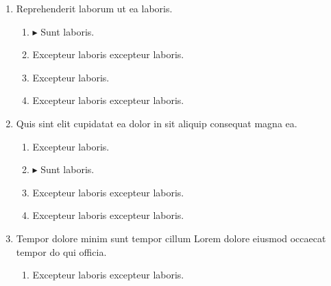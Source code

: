\documentclass[a4paper,12pt]{article}
\begin{document}
\begin{enumerate}[label=\textbf{\arabic*.}]
\begin{multicols}{2}
\begin{enumerate}
		\item  Excepteur laboris.
    
		\item  Excepteur laboris excepteur laboris.
    
		\item $\blacktriangleright$  Sunt laboris.
    
	\end{enumerate}

\end{multicols}
\item Reprehenderit laborum ut ea laboris.
\begin{multicols}{2}
	\begin{enumerate}
		\item $\blacktriangleright$  Sunt laboris.
    
		\item  Excepteur laboris excepteur laboris.
  
		\item  Excepteur laboris.
    
		\item  Excepteur laboris excepteur laboris.
    
	\end{enumerate}

\end{multicols}
\item Quis sint elit cupidatat ea dolor in sit aliquip consequat magna ea.
\begin{multicols}{2}
	\begin{enumerate}
		\item  Excepteur laboris.
    
		\item $\blacktriangleright$  Sunt laboris.
    
		\item  Excepteur laboris excepteur laboris.
    
		\item  Excepteur laboris excepteur laboris.
  
	\end{enumerate}

\end{multicols}
\item Tempor dolore minim sunt tempor cillum Lorem dolore eiusmod occaecat tempor do qui officia.
\begin{multicols}{2}
	\begin{enumerate}
		\item  Excepteur laboris excepteur laboris.
    

\end{enumerate}
\end{multicols}
\end{enumerate}
\end{document}
